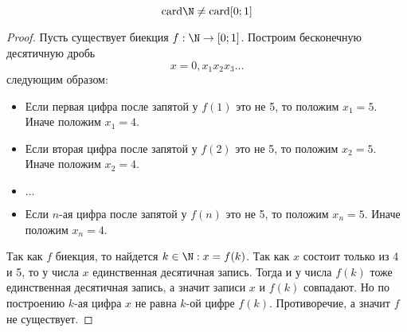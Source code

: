 \documentclass{article}
\newcommand{\card}{\mathrm{card}}
\begin{document}
\begin{theorem}
    \label{th:first-cantor-th}
    \[\card \N \neq \card [0;1]\]
\end{theorem}
\begin{proof}
    Пусть существует биекция \(f: \N \rightarrow [0;1]\). Построим бесконечную десятичную дробь \[x = 0,x_1x_2x_3\ldots\] следующим образом: 
    \begin{itemize}
        \item Если первая цифра после запятой у \(f(1)\) это не 5, то положим \(x_1 = 5\). Иначе положим \(x_1 = 4\).
        \item Если вторая цифра после запятой у \(f(2)\) это не 5, то положим \(x_2 = 5\). Иначе положим \(x_2 = 4\).
        \item \(\ldots\)
        \item Если \(n\)-ая цифра после запятой у \(f(n)\) это не 5, то положим \(x_n = 5\). Иначе положим \(x_n = 4\).
    \end{itemize}
    Так как \(f\) биекция, то найдется \(k \in \N: x = f(k)\). Так как \(x\) состоит только из 4 и 5, то у числа \(x\) единственная десятичная запись. Тогда и у числа \(f(k)\) тоже единственная десятичная запись, а значит записи \(x\) и \(f(k)\) совпадают. Но по построению \(k\)-ая цифра \(x\) не равна \(k\)-ой цифре \(f(k)\). Противоречие, а значит \(f\) не существует.
\end{proof}
\end{document}
